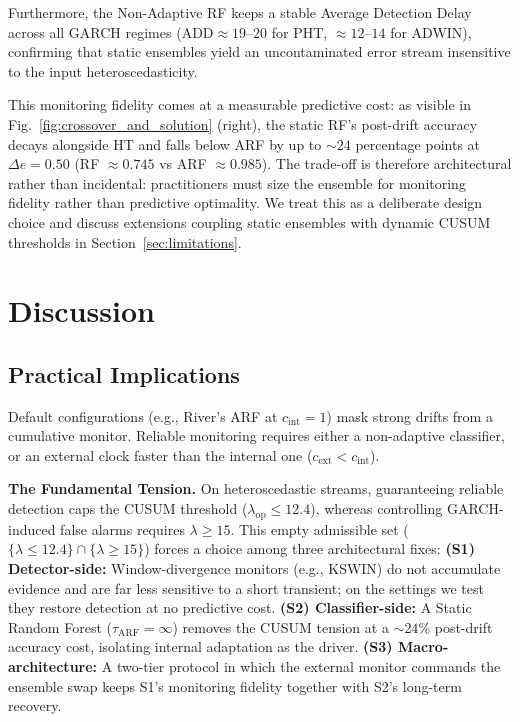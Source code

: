 \documentclass[10pt,conference]{IEEEtran}
\theoremstyle{definition}
\begin{document}
Furthermore, the Non-Adaptive RF keeps a stable Average Detection Delay across all GARCH regimes ($\mathrm{ADD} \approx 19$--$20$ for PHT, $\approx 12$--$14$ for ADWIN), confirming that static ensembles yield an uncontaminated error stream insensitive to the input heteroscedasticity.

This monitoring fidelity comes at a measurable predictive cost: as visible in Fig.~\ref{fig:crossover_and_solution} (right), the static RF's post-drift accuracy decays alongside HT and falls below ARF by up to $\sim 24$ percentage points at $\Delta e = 0.50$ (RF $\approx 0.745$ vs ARF $\approx 0.985$). The trade-off is therefore architectural rather than incidental: practitioners must size the ensemble for monitoring fidelity rather than predictive optimality. We treat this as a deliberate design choice and discuss extensions coupling static ensembles with dynamic CUSUM thresholds in Section~\ref{sec:limitations}.

\section{Discussion}\label{sec:discussion}

\subsection{Practical Implications}
Default configurations (e.g., River's ARF at $c_{\mathrm{int}} = 1$) mask strong drifts from a cumulative monitor. Reliable monitoring requires either a non-adaptive classifier, or an external clock faster than the internal one ($c_{\mathrm{ext}} < c_{\mathrm{int}}$).

\textbf{The Fundamental Tension.} On heteroscedastic streams, guaranteeing reliable detection caps the CUSUM threshold ($\lambda_{\mathrm{op}} \le 12.4$), whereas controlling GARCH-induced false alarms requires $\lambda \ge 15$. This empty admissible set ($\{\lambda \le 12.4\} \cap \{\lambda \ge 15\}$) forces a choice among three architectural fixes:
\textbf{(S1) Detector-side:} Window-divergence monitors (e.g., KSWIN) do not accumulate evidence and are far less sensitive to a short transient; on the settings we test they restore detection at no predictive cost.
\textbf{(S2) Classifier-side:} A Static Random Forest ($\tau_{\mathrm{ARF}} = \infty$) removes the CUSUM tension at a ${\sim}24\%$ post-drift accuracy cost, isolating internal adaptation as the driver.
\textbf{(S3) Macro-architecture:} A two-tier protocol in which the external monitor commands the ensemble swap keeps S1's monitoring fidelity together with S2's long-term recovery.
\end{document}
